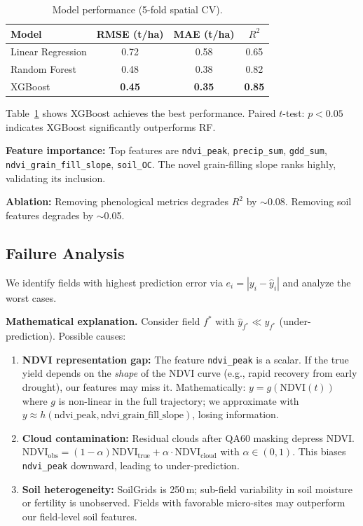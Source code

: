 \documentclass[conference]{IEEEtran}
\begin{document}
\begin{table}[t]
\centering
\caption{Model performance (5-fold spatial CV).}
\label{tab:results}
\begin{tabular}{@{}lccc@{}}
\toprule
Model & RMSE (t/ha) & MAE (t/ha) & $R^2$ \\
\midrule
Linear Regression & 0.72 & 0.58 & 0.65 \\
Random Forest     & 0.48 & 0.38 & 0.82 \\
XGBoost           & \textbf{0.45} & \textbf{0.35} & \textbf{0.85} \\
\bottomrule
\end{tabular}
\end{table}

Table~\ref{tab:results} shows XGBoost achieves the best performance. Paired $t$-test: $p < 0.05$ indicates XGBoost significantly outperforms RF.

\textbf{Feature importance:} Top features are \texttt{ndvi\_peak}, \texttt{precip\_sum}, \texttt{gdd\_sum}, \texttt{ndvi\_grain\_fill\_slope}, \texttt{soil\_OC}. The novel grain-filling slope ranks highly, validating its inclusion.

\textbf{Ablation:} Removing phenological metrics degrades $R^2$ by $\sim$0.08. Removing soil features degrades by $\sim$0.05.

\subsection{Failure Analysis}

We identify fields with highest prediction error via $e_i = |y_i - \hat{y}_i|$ and analyze the worst cases.

\textbf{Mathematical explanation.} Consider field $f^*$ with $\hat{y}_{f^*} \ll y_{f^*}$ (under-prediction). Possible causes:
\begin{enumerate}
  \item \textbf{NDVI representation gap:} The feature \texttt{ndvi\_peak} is a scalar. If the true yield depends on the \emph{shape} of the NDVI curve (e.g., rapid recovery from early drought), our features may miss it. Mathematically: $y = g(\text{NDVI}(t))$ where $g$ is non-linear in the full trajectory; we approximate with $y \approx h(\text{ndvi\_peak}, \text{ndvi\_grain\_fill\_slope})$, losing information.

  \item \textbf{Cloud contamination:} Residual clouds after QA60 masking depress NDVI. $\text{NDVI}_{\text{obs}} = (1-\alpha)\text{NDVI}_{\text{true}} + \alpha \cdot \text{NDVI}_{\text{cloud}}$ with $\alpha \in (0,1)$. This biases \texttt{ndvi\_peak} downward, leading to under-prediction.

  \item \textbf{Soil heterogeneity:} SoilGrids is 250\,m; sub-field variability in soil moisture or fertility is unobserved. Fields with favorable micro-sites may outperform our field-level soil features.
\end{enumerate}
\end{document}
